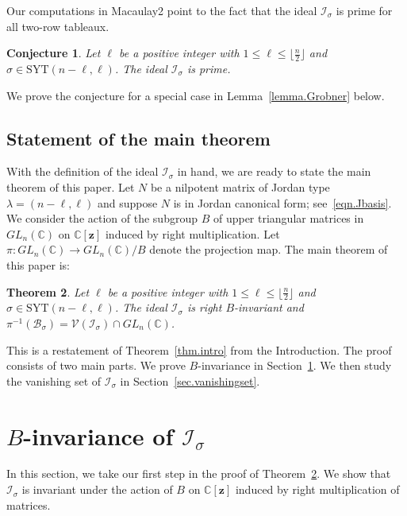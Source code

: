 \documentclass[11pt]{amsart}
\newtheorem{theorem}{Theorem}[section]
\newtheorem{conj}[theorem]{Conjecture}
\theoremstyle{remark}
\theoremstyle{remark}
\theoremstyle{definition}
\theoremstyle{definition}
\theoremstyle{definition}
\numberwithin{equation}{section}
\newcommand{\C}{\mathbb{C}}           %
\newcommand{\gs}{\sigma}
\newcommand{\cb}{\mathcal{B}}
\newcommand{\ci}{\mathcal{I}}
\newcommand{\cv}{\mathcal{V}}
\newcommand{\SYT}{\mathrm{SYT}}
\newcommand{\isigma}{\ci_\gs}
\begin{document}
Our computations in Macaulay2 point to the fact that the ideal $\isigma$ is prime for all two-row tableaux. 
\begin{conj}
Let $\ell$ be a positive integer with $1\leq \ell \leq \lfloor \frac{n}{2}\rfloor$ and  $\gs\in \SYT(n-\ell, \ell)$. The ideal $\ci_\gs$ is prime.
\end{conj}
We prove the conjecture for a special case in Lemma~\ref{lemma.Grobner} below.



\subsection{Statement of the main theorem} 

With the definition of the ideal $\ci_\gs$ in hand, we are ready to state the main theorem of this paper.
Let $N$ be a nilpotent matrix of Jordan type $\lambda = (n-\ell, \ell)$ and suppose $N$ is in Jordan canonical form; see~\eqref{eqn.Jbasis}. 
We consider the action of the subgroup $B$ of upper triangular matrices in $GL_n(\C)$ on $\C[\mathbf{z}]$ induced by right multiplication. Let $\pi:GL_n(\C)\to GL_n(\C)/B$ denote the projection map. The main theorem of this paper is: 

\begin{theorem}\label{thm.ideal} Let $\ell$ be a positive integer with $1\leq \ell \leq \lfloor \frac{n}{2}\rfloor$ and $\gs\in \SYT(n-\ell, \ell)$. The ideal $\ci_\gs$ is right $B$-invariant and $\pi^{-1}(\cb_\sigma) = \cv(\ci_\gs)\cap GL_n(\C)$. 
\end{theorem}


This is a restatement of Theorem~\ref{thm.intro} from the Introduction. The proof consists of two main parts. We prove $B$-invariance in Section~\ref{sec.binv}. We then study the vanishing set of $\ci_\gs$ in Section~\ref{sec.vanishingset}.




\section{$B$-invariance of $\ci_\gs$}\label{sec.binv}
In this section, we take our first step in the proof of Theorem~\ref{thm.ideal}. We show that $\ci_\gs$ is invariant under the action of $B$ on $\C[\mathbf{z}]$ induced by right multiplication of matrices. 
\end{document}
